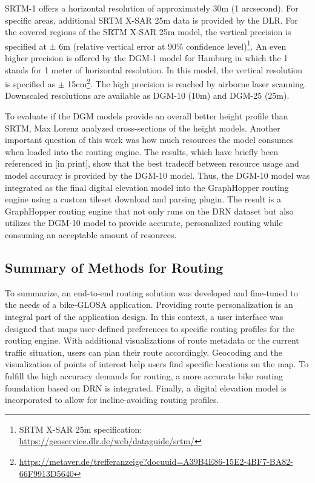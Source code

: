 SRTM-1 offers a horizontal resolution of approximately 30m (1 arcsecond). For specific areas, additional SRTM X-SAR 25m data is provided by the DLR. For the covered regions of the SRTM X-SAR 25m model, the vertical precision is specified at $\pm$ 6m (relative vertical error at 90\% confidence level)\footnote{SRTM X-SAR 25m specification: \url{https://geoservice.dlr.de/web/dataguide/srtm/}}. An even higher precision is offered by the DGM-1 model for Hamburg in which the 1 stands for 1 meter of horizontal resolution. In this model, the vertical resolution is specified as $\pm$ 15cm\footnote{\url{https://metaver.de/trefferanzeige?docuuid=A39B4E86-15E2-4BF7-BA82-66F9913D5640}}. The high precision is reached by airborne laser scanning. Downscaled resolutions are available as DGM-10 (10m) and DGM-25 (25m).

To evaluate if the DGM models provide an overall better height profile than SRTM, Max Lorenz analyzed cross-sections of the height models. Another important question of this work was how much resources the model consumes when loaded into the routing engine. The results, which have briefly been referenced in [in print], show that the best tradeoff between resource usage and model accuracy is provided by the DGM-10 model. Thus, the DGM-10 model was integrated as the final digital elevation model into the GraphHopper routing engine using a custom tileset download and parsing plugin. The result is a GraphHopper routing engine that not only runs on the DRN dataset but also utilizes the DGM-10 model to provide accurate, personalized routing while consuming an acceptable amount of resources. 

\subsection{Summary of Methods for Routing}

To summarize, an end-to-end routing solution was developed and fine-tuned to the needs of a bike-GLOSA application. Providing route personalization is an integral part of the application design. In this context, a user interface was designed that maps user-defined preferences to specific routing profiles for the routing engine. With additional visualizations of route metadata or the current traffic situation, users can plan their route accordingly. Geocoding and the visualization of points of interest help users find specific locations on the map. To fulfill the high accuracy demands for routing, a more accurate bike routing foundation based on DRN is integrated. Finally, a digital elevation model is incorporated to allow for incline-avoiding routing profiles.

